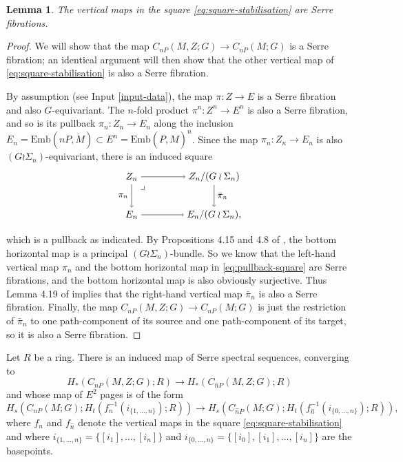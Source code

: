 \documentclass[reqno,a4paper]{article}
\numberwithin{equation}{section}
\theoremstyle{italicised}
\newtheorem{lem}[thm]{Lemma}
\theoremstyle{upright}
\theoremstyle{italicised-restate}
\begin{document}
\begin{lem}\label{l:square-fibre-bundles}
The vertical maps in the square \eqref{eq:square-stabilisation} are Serre fibrations.
\end{lem}
\begin{proof}
We will show that the map $C_{nP}(M,Z;G) \to C_{nP}(M;G)$ is a Serre fibration; an identical argument will then show that the other vertical map of \eqref{eq:square-stabilisation} is also a Serre fibration.

By assumption (see Input \ref{input-data}), the map $\pi \colon Z \to E$ is a Serre fibration and also $G$-equivariant. The $n$-fold product $\pi^n \colon Z^n \to E^n$ is also a Serre fibration, and so is its pullback $\pi_n \colon Z_n \to E_n$ along the inclusion $E_n = \mathrm{Emb}(nP,\mathring{M}) \subset E^n = \mathrm{Emb}(P,\hat{M})^n$. Since the map $\pi_n \colon Z_n \to E_n$ is also $(G \wr \Sigma_n)$-equivariant, there is an induced square
\begin{equation}\label{eq:pullback-square}
\centering
\begin{split}
\begin{tikzpicture}
[x=1mm,y=1mm]
\node (tl) at (0,14) {$Z_n$};
\node (tr) at (30,14) {$Z_n / (G \wr \Sigma_n)$};
\node (bl) at (0,0) {$E_n$};
\node (br) at (30,0) {$E_n / (G \wr \Sigma_n),$};
\draw[->] (tl) to (tr);
\draw[->] (bl) to (br);
\draw[->] (tl) to node[left,font=\small]{$\pi_n$} (bl);
\draw[->] (tr) to node[right,font=\small]{$\bar{\pi}_n$} (br);
\node at (4,10) {$\lrcorner$};
\end{tikzpicture}
\end{split}
\end{equation}
which is a pullback as indicated. By Propositions 4.15 and 4.8 of \cite{Palmer2018HomologicalstabilitymoduliI}, the bottom horizontal map is a principal $(G \wr \Sigma_n)$-bundle. So we know that the left-hand vertical map $\pi_n$ and the bottom horizontal map in \eqref{eq:pullback-square} are Serre fibrations, and the bottom horizontal map is also obviously surjective. Thus Lemma 4.19 of \cite{Palmer2018HomologicalstabilitymoduliI} implies that the right-hand vertical map $\bar{\pi}_n$ is also a Serre fibration. Finally, the map $C_{nP}(M,Z;G) \to C_{nP}(M;G)$ is just the restriction of $\bar{\pi}_n$ to one path-component of its source and one path-component of its target, so it is also a Serre fibration.
\end{proof}

Let $R$ be a ring. There is an induced map of Serre spectral sequences, converging to
\[
H_*(C_{nP}(M,Z;G);R) \longrightarrow H_*(C_{\hat{n}P}(M,Z;G);R)
\]
and whose map of $E^2$ pages is of the form
\[
H_s(C_{nP}(M;G);H_t(f_n^{-1}(i_{\{1,\ldots,n\}});R)) \longrightarrow H_s(C_{\hat{n}P}(M;G);H_t(f_{\hat{n}}^{-1}(i_{\{0,\ldots,n\}});R)),
\]
where $f_n$ and $f_{\hat{n}}$ denote the vertical maps in the square \eqref{eq:square-stabilisation} and where $i_{\{1,\ldots,n\}} = \{ [i_1],\ldots,[i_n] \}$ and $i_{\{0,\ldots,n\}} = \{ [i_0] , [i_1],\ldots,[i_n] \}$ are the basepoints.
\end{document}
